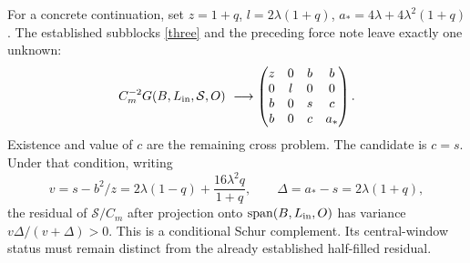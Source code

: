 \documentclass[11pt,a4paper]{article}
\begin{document}
For a concrete continuation, set $z=1+q$, $l=2\lambda(1+q)$,
$a_*=4\lambda+4\lambda^2(1+q)$. The established subblocks
\eqref{three} and the preceding force note leave exactly one unknown:
\begin{equation}
 C_m^{-2}G(B,L_{\rm in},\mathcal S,O)\ \longrightarrow
 \begin{pmatrix}z&0&b&b\\0&l&0&0\\b&0&s&c\\b&0&c&a_*\end{pmatrix}.
\end{equation}
Existence and value of $c$ are the remaining cross problem.
The candidate is $c=s$. Under that condition, writing
\begin{equation}
 v=s-b^2/z=2\lambda(1-q)+\frac{16\lambda^2q}{1+q},\qquad
 \Delta=a_*-s=2\lambda(1+q),
\end{equation}
the residual of $\mathcal S/C_m$ after projection onto
$\operatorname{span}(B,L_{\rm in},O)$ has variance
$v\Delta/(v+\Delta)>0$. This is a conditional Schur complement.
Its central-window status must remain distinct from the already
established half-filled residual.

\newpage
\end{document}
